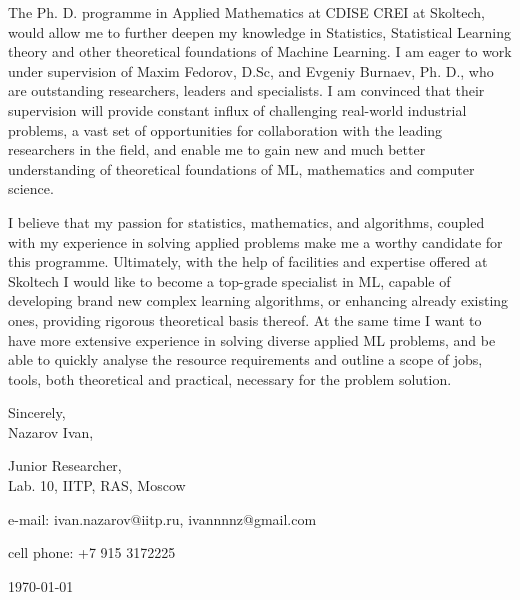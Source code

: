 \documentclass[14pt]{letter}
\begin{document}
The Ph. D. programme in Applied Mathematics at CDISE CREI at Skoltech, would allow me
to further deepen my knowledge in Statistics, Statistical Learning theory and other
theoretical foundations of Machine Learning. I am eager to work under supervision of
Maxim Fedorov, D.Sc, and Evgeniy Burnaev, Ph. D., who are outstanding researchers,
leaders and specialists. I am convinced that their supervision will provide constant
influx of challenging real-world industrial problems, a vast set of opportunities for
collaboration with the leading researchers in the field, and enable me to gain new and
much better understanding of theoretical foundations of ML, mathematics and computer
science. \par\medskip

I believe that my passion for statistics, mathematics, and algorithms, coupled with
my experience in solving applied problems make me a worthy candidate for this programme.
Ultimately, with the help of facilities and expertise offered at Skoltech I would like
to become a top-grade specialist in ML, capable of developing brand new complex learning
algorithms, or enhancing already existing ones, providing rigorous theoretical basis
thereof. At the same time I want to have more extensive experience in solving diverse
applied ML problems, and be able to quickly analyse the resource requirements and
outline a scope of jobs, tools, both theoretical and practical, necessary for the
problem solution. \par\medskip

\hfill\par
Sincerely, \\
Nazarov Ivan, \par
Junior Researcher, \\
Lab. 10, IITP, RAS, Moscow \par

\hfill\par
e-mail: ivan.nazarov@iitp.ru, ivannnnz@gmail.com \par
cell phone: +7 915 3172225
\vfill\par
\hfill\today
\end{document}
